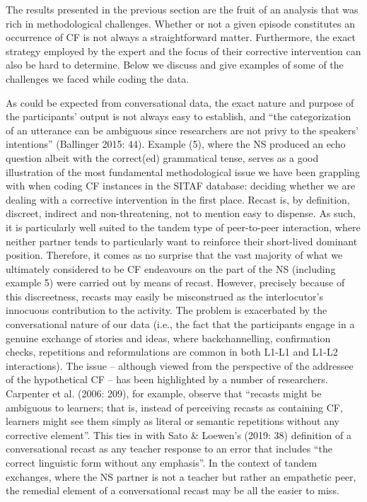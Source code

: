 \documentclass[12pt]{article}
\newenvironment{styleNewparagraph}{\renewcommand\baselinestretch{1.6666666}\setlength\leftskip{0in}\setlength\rightskip{0in plus 1fil}\setlength\parindent{0.5in}\setlength\parfillskip{0pt plus 1fil}\setlength\parskip{0cm plus 1pt}\writerlistparindent\writerlistleftskip\leavevmode\normalfont\normalsize\writerlistlabel\ignorespaces}{\unskip\vspace{0cm plus 1pt}\par}
\newcommand\writerlistleftskip{}
\newcommand\writerlistparindent{}
\newcommand\writerlistlabel{}
\begin{document}
\begin{styleNewparagraph}
The results presented in the previous section are the fruit of an analysis that was rich in methodological challenges. Whether or not a given episode constitutes an occurrence of CF is not always a straightforward matter. Furthermore, the exact strategy employed by the expert and the focus of their corrective intervention can also be hard to determine. Below we discuss and give examples of some of the challenges we faced while coding the data.
\end{styleNewparagraph}

\begin{styleNewparagraph}
As could be expected from conversational data, the exact nature and purpose of the participants’ output is not always easy to establish, and “the categorization of an utterance can be ambiguous since researchers are not privy to the speakers’ intentions” (Ballinger 2015: 44). Example (5), where the NS produced an echo question albeit with the correct(ed) grammatical tense, serves as a good illustration of the most fundamental methodological issue we have been grappling with when coding CF instances in the SITAF database: deciding whether we are dealing with a corrective intervention in the first place. Recast is, by definition, discreet, indirect and non-threatening, not to mention easy to dispense. As such, it is particularly well suited to the tandem type of peer-to-peer interaction, where neither partner tends to particularly want to reinforce their short-lived dominant position. Therefore, it comes as no surprise that the vast majority of what we ultimately considered to be CF endeavours on the part of the NS (including example 5) were carried out by means of recast. However, precisely because of this discreetness, recasts may easily be misconstrued as the interlocutor’s innocuous contribution to the activity. The problem is exacerbated by the conversational nature of our data (i.e., the fact that the participants engage in a genuine exchange of stories and ideas, where backchannelling, confirmation checks, repetitions and reformulations are common in both L1-L1 and L1-L2 interactions). The issue – although viewed from the perspective of the addressee of the hypothetical CF – has been highlighted by a number of researchers. Carpenter et al. (2006: 209), for example, observe that “recasts might be ambiguous to learners; that is, instead of perceiving recasts as containing CF, learners might see them simply as literal or semantic repetitions without any corrective element”. This ties in with Sato \& Loewen’s (2019: 38) definition of a conversational recast as any teacher response to an error that includes “the correct linguistic form without any emphasis”. In the context of tandem exchanges, where the NS partner is not a teacher but rather an empathetic peer, the remedial element of a conversational recast may be all the easier to miss.
\end{styleNewparagraph}
\end{document}
